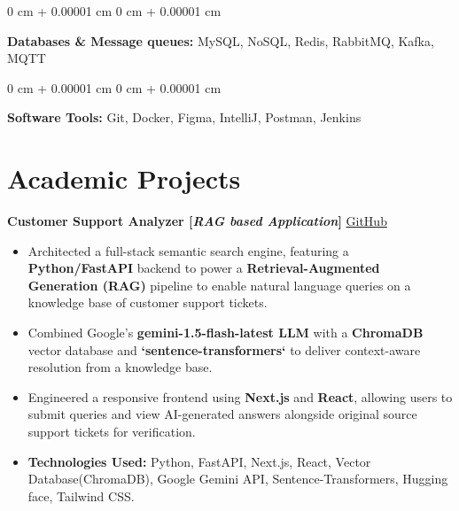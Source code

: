 \documentclass[10pt, letterpaper]{article}
\newenvironment{highlights}{
    \begin{itemize}[
        topsep=0.10 cm,     %
        parsep=0.10 cm,     %
        partopsep=0pt,      %
        itemsep=0pt,        %
        leftmargin=0 cm + 10pt  %
    ]
}{
    \end{itemize}
}
\newenvironment{onecolentry}{
    \begin{adjustwidth}{
        0 cm + 0.00001 cm
    }{
        0 cm + 0.00001 cm
    }
}{
    \end{adjustwidth}
}
\begin{document}
        \vspace{0.1 cm}
        
        \begin{onecolentry}
        \textbf{Databases \& Message queues:} MySQL, NoSQL, Redis, RabbitMQ, Kafka, MQTT \  %
        \end{onecolentry}
        
        \vspace{0.1 cm}
        
        \begin{onecolentry}
        \textbf{Software Tools:} Git, Docker, Figma, IntelliJ, Postman, Jenkins \\  %
        \vspace{0.1 cm}
        \end{onecolentry}


    \section{Academic Projects}

        \noindent
        \textbf{Customer Support Analyzer [\textit{RAG based Application}]} \hfill \href{https://github.com/tushar-fs/customer-support-analyzer}{\small \faGithub \space GitHub}
        
        \begin{highlights}
            \item Architected a full-stack semantic search engine, featuring a \textbf{Python/FastAPI} backend to power a \textbf{Retrieval-Augmented Generation (RAG)} pipeline to enable natural language queries on a knowledge base of customer support tickets.
            \item Combined Google's \textbf{gemini-1.5-flash-latest LLM} with a \textbf{ChromaDB} vector database and \textbf{`sentence-transformers`} to deliver context-aware resolution from a knowledge base.
            \item Engineered a responsive frontend using \textbf{Next.js} and \textbf{React}, allowing users to submit queries and view AI-generated answers alongside original source support tickets for verification.
            \item \textbf{Technologies Used:} Python, FastAPI, Next.js, React, Vector Database(ChromaDB), Google Gemini API, Sentence-Transformers, Hugging face, Tailwind CSS.
        \end{highlights}
\end{document}
